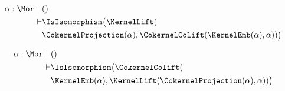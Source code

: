 \begin{sequent}
\begin{align*}
  \alpha:\Mor~|~ &() \\
  \vdash &\IsIsomorphism\big( \KernelLift( \\
  &\CokernelProjection( \alpha ), \CokernelColift( \KernelEmb( \alpha ), \alpha ))\big)
\end{align*}
\end{sequent}

\begin{sequent}
\begin{align*}
  \alpha:\Mor~|~ &() \\
  \vdash &\IsIsomorphism\big( \CokernelColift( \\
  &\KernelEmb( \alpha ), \KernelLift( \CokernelProjection( \alpha ), \alpha ))\big)
\end{align*}
\end{sequent}